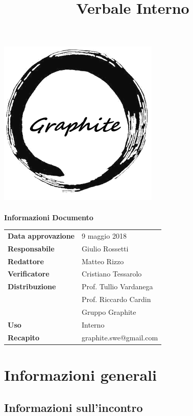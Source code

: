 \documentclass[openany,12pt,a4paper]{article}
\title{Verbale Interno}
\author{}
\begin{document}
	\makeatletter
	\begin{titlepage}
		\setlength{\headsep}{0pt}  
		\begin{center}
			\includegraphics[width=0.5\linewidth]{Logo.png}\\[1em]
			{\huge \bfseries  \@title }\\[10ex]
			\textbf{\Large Informazioni Documento} \\[2em]
			\bgroup
			\def\arraystretch{1.5}
			\begin{tabular}{l|l}
				\textbf{Data approvazione} & 9 maggio 2018 \\
				\textbf{Responsabile} & Giulio Rossetti \\
				\textbf{Redattore} & Matteo Rizzo \\
				\textbf{Verificatore} & Cristiano Tessarolo \\
				\textbf{Distribuzione} & Prof. Tullio Vardanega \\
				 & Prof. Riccardo Cardin \\
				 & Gruppo Graphite \\
				\textbf{Uso} & Interno \\
				\textbf{Recapito} & graphite.swe@gmail.com \\
			\end{tabular}
		\egroup
		\end{center}
	\end{titlepage}
	\makeatother

	\thispagestyle{empty}
	\newpage
	
	\tableofcontents
	\newpage
	
	\section{Informazioni generali}
	
	\subsection{Informazioni sull'incontro}
	
\end{document}
